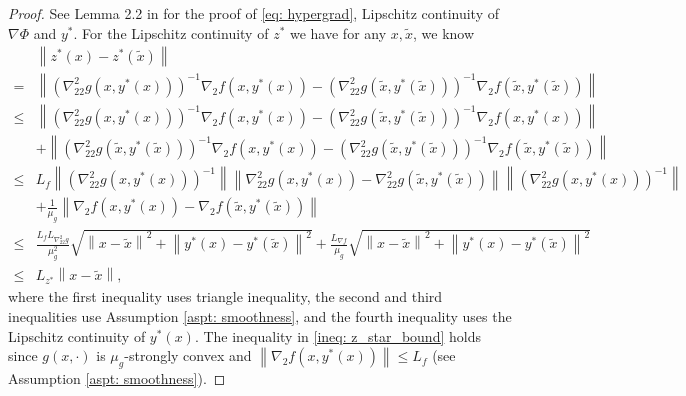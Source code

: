 \documentclass[10pt]{article}
\theoremstyle{remark}
\newcommand{\norm}[1]{\left\|#1\right\|}
\begin{document}
\begin{proof}
    See Lemma 2.2 in \cite{ghadimi2018approximation} for the proof of \eqref{eq: hypergrad}, Lipschitz continuity of $\nabla\Phi$ and $y^*$. For the Lipschitz continuity of $z^*$ we have for any $x, \tilde x$, we know
    \begin{align*}
        &\norm{z^*(x)- z^*(\tilde x)} \\
        = &\norm{\left(\nabla_{22}^2g(x, y^*(x))\right)^{-1}\nabla_2f(x, y^*(x)) - \left(\nabla_{22}^2g(\tilde x, y^*(\tilde x))\right)^{-1}\nabla_2f(\tilde x, y^*(\tilde x))} \\
        \leq & \norm{\left(\nabla_{22}^2g(x, y^*(x))\right)^{-1}\nabla_2f(x, y^*(x)) - \left(\nabla_{22}^2g(\tilde x, y^*(\tilde x))\right)^{-1}\nabla_2f(x, y^*(x))} \\
        & + \norm{\left(\nabla_{22}^2g(\tilde x, y^*(\tilde x))\right)^{-1}\nabla_2f(x, y^*(x)) - \left(\nabla_{22}^2g(\tilde x, y^*(\tilde x))\right)^{-1}\nabla_2f(\tilde x, y^*(\tilde x))} \\
        \leq &L_f\norm{\left(\nabla_{22}^2g(x,y^*(x))\right)^{-1}}\norm{\nabla_{22}^2g(x,y^*(x)) - \nabla_{22}^2g(\tilde x,y^*(\tilde x))}\norm{\left(\nabla_{22}^2g(x,y^*(x))\right)^{-1}} \\
        &+ \frac{1}{\mu_g}\norm{\nabla_2f(x, y^*(x)) - \nabla_2f(\tilde x, y^*(\tilde x))} \\
        \leq &\frac{L_f L_{\nabla_{22}^2g}}{\mu_g^2}\sqrt{\norm{x - \tilde x}^2 + \norm{y^*(x) - y^*(\tilde x)}^2} + \frac{L_{\nabla f}}{\mu_g}\sqrt{\norm{x - \tilde x}^2 + \norm{y^*(x) - y^*(\tilde x)}^2} \\
        \leq &L_{z^*}\norm{x - \tilde x},
    \end{align*}
    where the first inequality uses triangle inequality, the second and third inequalities use Assumption \ref{aspt: smoothness}, and the fourth inequality uses the Lipschitz continuity of $y^*(x)$. The inequality in \eqref{ineq: z_star_bound} holds since $g(x,\cdot)$ is $\mu_g$-strongly convex and $\norm{\nabla_2f(x, y^*(x))}\leq L_f$ (see Assumption \ref{aspt: smoothness}).
\end{proof}
\end{document}
